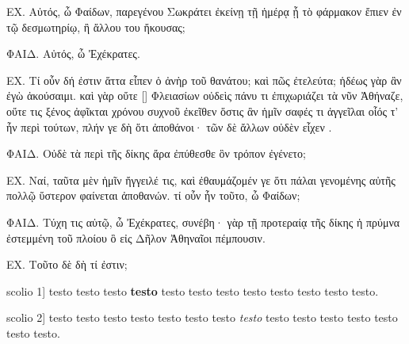 \documentclass[11pt,a4paper]{book}
\makeatletter
\renewcommand{\thepstart}{{\makebox[2mm][r]{\bf\@arabic\c@pstart}}\hspace{3mm}}
\newcounter{para}[chapter]\setcounter{para}{0}
\newcommand{\newpara}{%
    \refstepcounter{para}%
    \noindent\llap{\thepstart}}
\makeatother
\begin{document}
\beginnumbering

\pstart
{}ΕΧ. Αὐτός, ὦ Φαίδων, παρεγένου Σωκράτει ἐκείνῃ τῇ ἡμέρᾳ ᾗ τὸ φάρμακον ἔπιεν ἐν τῷ δεσμωτηρίῳ, ἢ ἄλλου του ἤκουσας;

ΦΑΙΔ. Αὐτός, ὦ Ἐχέκρατες.

ΕΧ. Τί οὖν δή ἐστιν ἅττα εἶπεν ὁ ἀνὴρ  τοῦ θανάτου; καὶ πῶς ἐτελεύτα; ἡδέως γὰρ ἂν ἐγὼ ἀκούσαιμι. καὶ γὰρ οὔτε [] Φλειασίων οὐδεὶς πάνυ τι ἐπιχωριάζει τὰ νῦν Ἀθήναζε, οὔτε τις ξένος ἀφῖκται χρόνου συχνοῦ ἐκεῖθεν ὅστις ἂν ἡμῖν σαφές τι ἀγγεῖλαι οἷός τ' ἦν περὶ τούτων, πλήν γε δὴ ὅτι   ἀποθάνοι· τῶν δὲ ἄλλων οὐδὲν εἶχεν .

ΦΑΙΔ. Οὐδὲ τὰ περὶ τῆς δίκης ἄρα ἐπύθεσθε ὃν τρόπον ἐγένετο;

ΕΧ. Ναί, ταῦτα μὲν ἡμῖν ἤγγειλέ τις, καὶ ἐθαυμάζομέν γε ὅτι πάλαι γενομένης αὐτῆς πολλῷ ὕστερον φαίνεται ἀποθανών. τί οὖν ἦν τοῦτο, ὦ Φαίδων;

ΦΑΙΔ. Τύχη τις αὐτῷ, ὦ Ἐχέκρατες, συνέβη·  γὰρ τῇ προτεραίᾳ τῆς δίκης ἡ πρύμνα ἐστεμμένη τοῦ πλοίου ὃ εἰς Δῆλον Ἀθηναῖοι πέμπουσιν.

ΕΧ. Τοῦτο δὲ δὴ τί ἐστιν; 
\pend

\setcounter{pstart}{1}
\numberpstarttrue
    \pstart\newpara \label{scolio1}scolio 1] testo  testo testo \textbf{testo} testo testo testo testo testo testo testo testo.\pend

    \pstart\newpara \label{scolio2}scolio 2]  testo testo testo testo testo testo testo \textit{testo} testo testo testo testo testo testo testo.
    \pend
\end{document}
